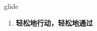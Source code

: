 
\begin{frame}
{\huge glide}
\begin{center}
\begin{enumerate}\Large
  \item \textbf{轻松地行动，轻松地通过}
\end{enumerate}
\end{center}
\end{frame}
